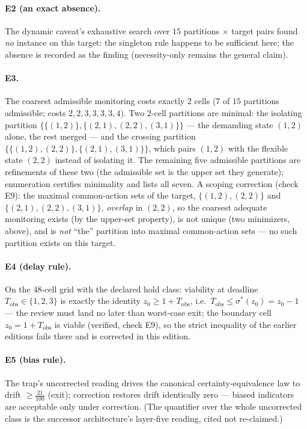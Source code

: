 \documentclass[10pt,twocolumn]{article}
\theoremstyle{definition}
\begin{document}
\paragraph{E2 (an exact absence).} The dynamic caveat's exhaustive search
over $15$ partitions $\times$ target pairs found \emph{no} instance on
this target: the singleton rule happens to be sufficient here; the absence
is recorded as the finding (necessity-only remains the general claim).

\paragraph{E3.} The coarsest admissible monitoring costs exactly $2$ cells
($7$ of $15$ partitions admissible; costs $2,2,3,3,3,3,4$). Two $2$-cell
partitions are minimal: the isolating partition
$\{\{(1,2)\},\{(2,1),(2,2),(3,1)\}\}$ --- the demanding state $(1,2)$
alone, the rest merged --- and the crossing partition
$\{\{(1,2),(2,2)\},\{(2,1),(3,1)\}\}$, which pairs $(1,2)$ with the
flexible state $(2,2)$ instead of isolating it. The remaining five
admissible partitions are refinements of these two (the admissible set is
the upper set they generate); enumeration certifies minimality and lists
all seven. A scoping correction (check E9): the maximal
common-action sets of the target, $\{(1,2),(2,2)\}$ and
$\{(2,1),(2,2),(3,1)\}$, \emph{overlap} in $(2,2)$, so the coarsest
adequate monitoring exists (by the upper-set property), is not unique
(two minimizers, above), and is \emph{not} ``the'' partition into maximal
common-action sets --- no such partition exists on this target.

\paragraph{E4 (delay rule).} On the $48$-cell grid with the declared hold
class: viability at deadline $T_{\mathrm{obs}}\in\{1,2,3\}$ is exactly the
identity $z_0\ge1+T_{\mathrm{obs}}$, i.e.\
$T_{\mathrm{obs}}\le\sigma^\ast(z_0) = z_0 - 1$ --- the review must land no
later than worst-case exit; the boundary cell $z_0 = 1 + T_{\mathrm{obs}}$
is viable (verified, check E9), so the strict inequality of the earlier
editions fails there and is corrected in this edition.

\paragraph{E5 (bias rule).} The trap's uncorrected reading drives the
canonical certainty-equivalence law to drift $\ge\tfrac{21}{100}$ (exit);
correction restores drift identically zero --- biased indicators are
acceptable only under correction. (The quantifier over the whole uncorrected
class is the successor architecture's layer-five reading, cited not
re-claimed.)
\end{document}
